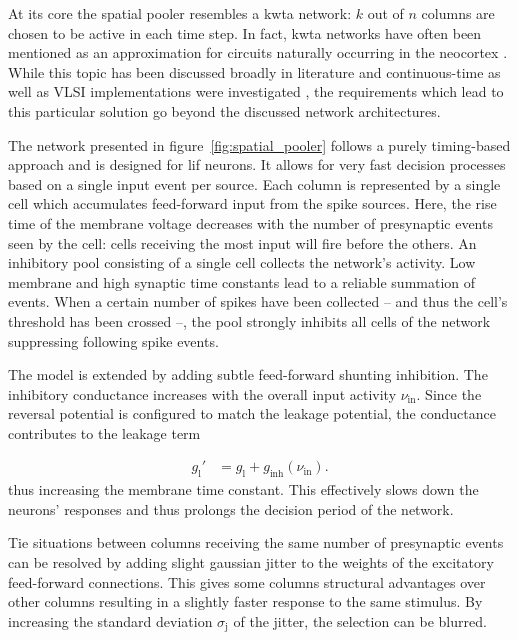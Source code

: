 At its core the spatial pooler resembles a \gls{kwta} network: $k$ out of $n$ columns are chosen to be active in each time step. In fact, \gls{kwta} networks have often been mentioned as an approximation for circuits naturally occurring in the neocortex \citep{felch2008hypergeometric}. While this topic has been discussed broadly in literature and continuous-time as well as VLSI implementations were investigated \citep{erlanson1991analog,tymoshchuk2012,maass2000neural}, the requirements which lead to this particular solution go beyond the discussed network architectures.

The network presented in figure~\ref{fig:spatial_pooler} follows a purely timing-based approach and is designed for \gls{lif} neurons. It allows for very fast decision processes based on a single input event per source. Each column is represented by a single cell which accumulates feed-forward input from the spike sources. Here, the rise time of the membrane voltage decreases with the number of presynaptic events seen by the cell: cells receiving the most input will fire before the others. An inhibitory pool consisting of a single cell collects the network's activity. Low membrane and high synaptic time constants lead to a reliable summation of events. When a certain number of spikes have been collected -- and thus the cell's threshold has been crossed --, the pool strongly inhibits all cells of the network suppressing following spike events.

The model is extended by adding subtle feed-forward shunting inhibition. The inhibitory conductance increases with the overall input activity $\nu_\text{in}$. Since the reversal potential is configured to match the leakage potential, the conductance contributes to the leakage term

\begin{align*}
	g_\text{l}' &= g_\text{l} + g_\text{inh}(\nu_\text{in}).
\end{align*}
%
thus increasing the membrane time constant. This effectively slows down the neurons' responses and thus prolongs the decision period of the network.

Tie situations between columns receiving the same number of presynaptic events can be resolved by adding slight gaussian jitter to the weights of the excitatory feed-forward connections. This gives some columns structural advantages over other columns resulting in a slightly faster response to the same stimulus. By increasing the standard deviation $\sigma_\text{j}$ of the jitter, the selection can be blurred.

